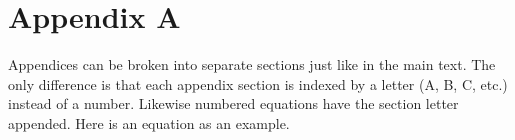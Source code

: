 \documentclass[twocolumn]{aastex6}
\begin{document}
\appendix

\section{Appendix A}

Appendices can be broken into separate sections just like in the main text.
The only difference is that each appendix section is indexed by a letter
(A, B, C, etc.) instead of a number.  Likewise numbered equations have
the section letter appended.  Here is an equation as an example.



\begin{thebibliography}{}

\end{thebibliography}

\allauthors

\listofchanges
\end{document}
